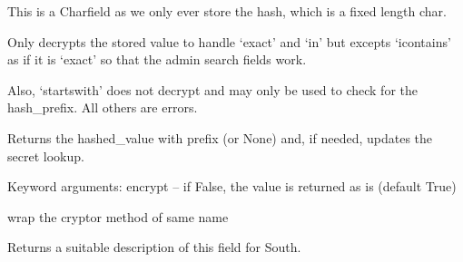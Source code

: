 \documentclass[letterpaper,10pt,english]{sphinxmanual}
\begin{document}
\begin{fulllineitems}
\begin{fulllineitems}
\label{field_classes:bhp_crypto.classes.BaseEncryptedField.get_internal_type}
This is a Charfield as we only ever store the hash, which is a         fixed length char.

\end{fulllineitems}


\begin{fulllineitems}
\label{field_classes:bhp_crypto.classes.BaseEncryptedField.get_prep_lookup}
Only decrypts the stored value to handle `exact' and `in'
but excepts `icontains' as if it is `exact' so that the admin
search fields work.

Also, `startswith' does not decrypt and may only be used to check for the hash\_prefix.
All others are errors.

\end{fulllineitems}


\begin{fulllineitems}
\label{field_classes:bhp_crypto.classes.BaseEncryptedField.get_prep_value}
Returns the hashed\_value with prefix (or None) and, if needed, updates the secret lookup.

Keyword arguments:
encrypt -- if False, the value is returned as is (default True)

\end{fulllineitems}


\begin{fulllineitems}
\label{field_classes:bhp_crypto.classes.BaseEncryptedField.is_encrypted}
wrap the cryptor method of same name

\end{fulllineitems}


\begin{fulllineitems}
\label{field_classes:bhp_crypto.classes.BaseEncryptedField.south_field_triple}
Returns a suitable description of this field for South.


\end{fulllineitems}
\end{fulllineitems}
\end{document}
